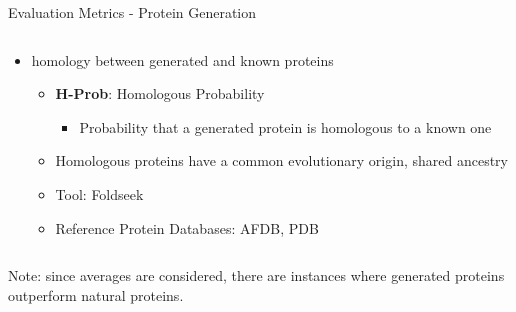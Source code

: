 \begin{frame}[shrink=10]{Evaluation Metrics - Protein Generation}
\begin{columns}
\begin{column}{0.5\textwidth}
\begin{itemize}
\begin{itemize}
					\item Tool: Foldseek
					\item Reference Protein Databases: AFDB, PDB
				\end{itemize}
				\item homology between generated and known proteins
				\begin{itemize}
					\item \textbf{H-Prob}: Homologous Probability
					\begin{itemize}\setlength\itemsep{1em}
						\item Probability that a generated protein is homologous to a known one
					\end{itemize}
					\item Homologous proteins have a common evolutionary origin, shared ancestry
					\item Tool: Foldseek
					\item Reference Protein Databases: AFDB, PDB
				\end{itemize}
			\end{itemize}
		\end{column}
	\end{columns}
	\vspace{1em}
	Note: since averages are considered, there are instances where generated proteins outperform natural proteins.
\end{frame}